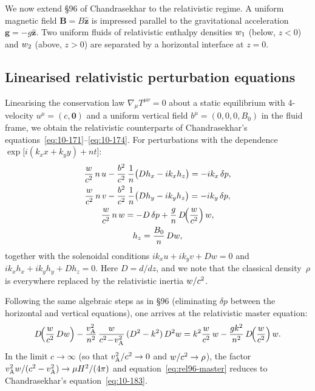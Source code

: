 We now extend \S96 of Chandrasekhar to the relativistic regime.  A
uniform magnetic field $\mathbf{B}=B\hat{\mathbf{z}}$ is impressed
parallel to the gravitational acceleration
$\mathbf{g}=-g\hat{\mathbf{z}}$.  Two uniform fluids of relativistic
enthalpy densities $w_{1}$ (below, $z<0$) and $w_{2}$
(above, $z>0$) are separated by a horizontal interface at $z=0$.

\subsection{Linearised relativistic perturbation equations}

Linearising the conservation law $\nabla_{\mu}T^{\mu\nu}=0$ about a
static equilibrium with 4-velocity $u^{\mu}=(c,\mathbf{0})$ and a
uniform vertical field $b^{\mu}=(0,0,0,B_{0})$ in the fluid frame, we
obtain the relativistic counterparts of Chandrasekhar's
equations~\eqref{eq:10-171}--\eqref{eq:10-174}.  For perturbations with
the dependence $\exp\!\bigl[i(k_{x}x+k_{y}y)+nt\bigr]$:
\begin{gather}
  \frac{w}{c^{2}}\,n\,u
    - \frac{b^{2}}{c^{2}}\,\frac{1}{n}\bigl(D h_{x}-ik_{x}h_{z}\bigr)
    = -ik_{x}\,\delta p,
  \label{eq:rel96-perturb-x}\\
  \frac{w}{c^{2}}\,n\,v
    - \frac{b^{2}}{c^{2}}\,\frac{1}{n}\bigl(D h_{y}-ik_{y}h_{z}\bigr)
    = -ik_{y}\,\delta p,
  \label{eq:rel96-perturb-y}\\
  \frac{w}{c^{2}}\,n\,w
    = -D\,\delta p + \frac{g}{n}\,D\!\Bigl(\frac{w}{c^{2}}\Bigr)\,w,
  \label{eq:rel96-perturb-z}\\
  h_{z} = \frac{B_{0}}{n}\,Dw,
  \label{eq:rel96-hz}
\end{gather}
together with the solenoidal conditions $ik_{x}u+ik_{y}v+Dw=0$ and
$ik_{x}h_{x}+ik_{y}h_{y}+Dh_{z}=0$.  Here $D=d/dz$, and we note that
the classical density~$\rho$ is everywhere replaced by the relativistic
inertia $w/c^{2}$.

Following the same algebraic steps as in
\S96 (eliminating $\delta p$ between the horizontal and vertical
equations), one arrives at the relativistic master equation:
\begin{equation}
  D\!\Bigl(\frac{w}{c^{2}}\,Dw\Bigr)
    - \frac{v_{\mathrm{A}}^{2}}{n^{2}}\,\frac{w}{c^{2}\!-\!v_{\mathrm{A}}^{2}}\,
      (D^{2}-k^{2})\,D^{2}w
    = k^{2}\frac{w}{c^{2}}\,w
      - \frac{gk^{2}}{n^{2}}\,D\!\Bigl(\frac{w}{c^{2}}\Bigr)\,w.
  \label{eq:rel96-master}
\end{equation}
In the limit $c\to\infty$ (so that $v_{\mathrm{A}}^{2}/c^{2}\to0$ and
$w/c^{2}\to\rho$), the factor
$v_{\mathrm{A}}^{2}w/(c^{2}-v_{\mathrm{A}}^{2})\to\mu H^{2}/(4\pi)$ and
equation~\eqref{eq:rel96-master} reduces to Chandrasekhar's
equation~\eqref{eq:10-183}.

